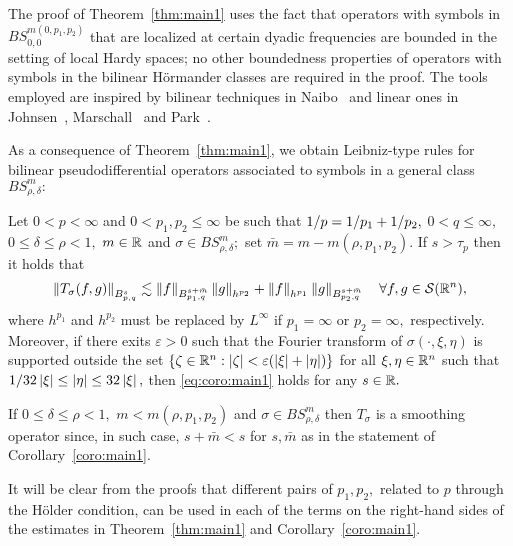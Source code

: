 The proof of Theorem~\ref{thm:main1} uses the fact that operators with symbols in $BS^{m(0,p_1,p_2)}_{0,0}$ that are localized at certain dyadic frequencies are bounded in the setting of local Hardy spaces; no other boundedness properties of operators with symbols in the bilinear H\"ormander classes are required in the proof. The tools employed are inspired by bilinear techniques in Naibo~\cite{MR3393696} and linear ones in   Johnsen~\cite{MR2163627}, Marschall~\cite{MR1376592} and   Park~\cite{Park}.

As a consequence of Theorem~\ref{thm:main1}, we obtain  Leibniz-type rules for bilinear pseudodifferential operators associated to symbols in a general class $BS^m_{\rho,\delta}:$

\begin{corollary}\label{coro:main1} 
Let $0<p<\infty$ and $0<p_1,p_2\le \infty$ be such that $\hcline,$ $0<q\le \infty,$  $0\le\delta \le \rho<1,$   $m\in \re$ and $\sigma\in BS^{m}_{\rho,\delta};$ set $\bar{m}=m-m(\rho,p_1,p_2).$  If  $s>\tau_p$ then it holds that
\begin{equation}\label{eq:coro:main1}
\norm{T_\sigma(f,g)}{\ibes{p}{s}{q}}\lesssim \norm{f}{\ibes{p_1}{s+\bar{m}}{q}}\norm{g}{h^{p_2}} +\norm{f}{h^{p_1}}\norm{g}{\ibes{p_2}{s+\bar{m}}{q}}\quad \forall f,g\in \sw,
\end{equation}
where $h^{p_1}$ and $h^{p_2}$ must be replaced by $L^\infty$ if $p_1=\infty$ or $p_2=\infty,$ respectively. Moreover,  if there exits $\varepsilon>0$ such that the Fourier transform of  $\sigma(\cdot,\xi,\eta)$ is  supported outside the set  $\{\zeta\in\rn:\abs{\zeta}<\varepsilon (\abs{\xi}+\abs{\eta})\}$ for all  $\xi,\eta\in\rn$ such that $1/32\abs{\xi}\le \abs{\eta}\le 32 \abs{\xi},$ then \eqref{eq:coro:main1} holds for any $s\in\re.$
\end{corollary}

\begin{remark} If $0\le \delta\le \rho<1,$ $m<m(\rho,p_1,p_2)$ and $\sigma\in BS^m_{\rho,\delta}$ then $T_\sigma$ is a smoothing operator since, in such case, $s+\bar{m}<s$ for $s,\bar{m}$ as in the statement of Corollary~\ref{coro:main1}. 
\end{remark}

\begin{remark} It will be clear from the proofs that different pairs of $p_1,p_2,$ related to $p$ through the H\"older condition, can be used in each of the terms on the right-hand sides of the estimates in Theorem~\ref{thm:main1} and Corollary~\ref{coro:main1}. 
\end{remark}

